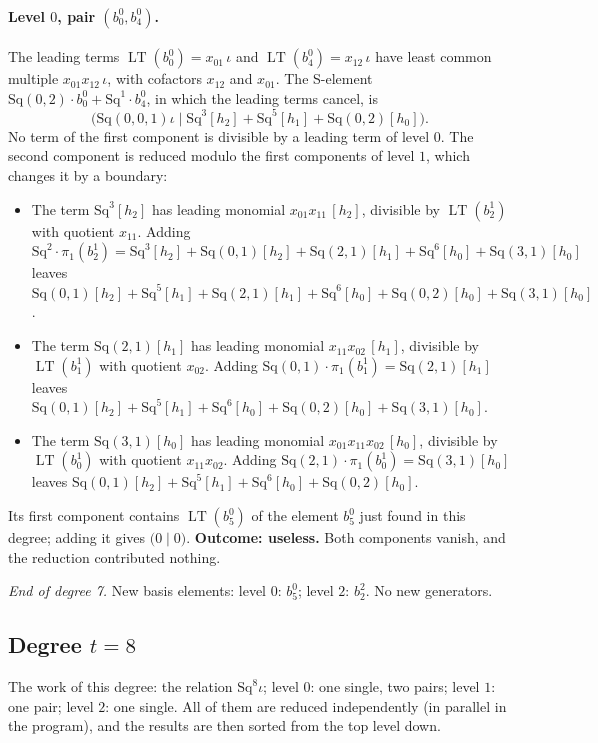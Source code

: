 \documentclass[11pt]{article}
\newcommand{\Sq}{\mathrm{Sq}}
\DeclareMathOperator{\LT}{LT}
\begin{document}
\paragraph{Level $0$, pair $(b^{0}_{0}, b^{0}_{4})$.} The leading terms $\LT(b^{0}_{0}) = x_{01}\,\iota$ and $\LT(b^{0}_{4}) = x_{12}\,\iota$ have least common multiple $x_{01}x_{12}\,\iota$, with cofactors $x_{12}$ and $x_{01}$. The S-element $\Sq(0,2)\cdot b^{0}_{0} + \Sq^{1}\cdot b^{0}_{4}$, in which the leading terms cancel, is
\[\bigl(\Sq(0,0,1)\iota \;\big|\; \Sq^{3}[h_2] + \Sq^{5}[h_1] + \Sq(0,2)[h_0]\bigr).\]
No term of the first component is divisible by a leading term of level $0$.
The second component is reduced modulo the first components of level $1$, which changes it by a boundary:
\begin{itemize}
\item The term $\Sq^{3}[h_2]$ has leading monomial $x_{01}x_{11}\,[h_2]$, divisible by $\LT(b^{1}_{2})$ with quotient $x_{11}$. Adding $\Sq^{2}\cdot \pi_1(b^{1}_{2}) = \Sq^{3}[h_2] + \Sq(0,1)[h_2] + \Sq(2,1)[h_1] + \Sq^{6}[h_0] + \Sq(3,1)[h_0]$ leaves $\Sq(0,1)[h_2] + \Sq^{5}[h_1] + \Sq(2,1)[h_1] + \Sq^{6}[h_0] + \Sq(0,2)[h_0] + \Sq(3,1)[h_0]$.
\item The term $\Sq(2,1)[h_1]$ has leading monomial $x_{11}x_{02}\,[h_1]$, divisible by $\LT(b^{1}_{1})$ with quotient $x_{02}$. Adding $\Sq(0,1)\cdot \pi_1(b^{1}_{1}) = \Sq(2,1)[h_1]$ leaves $\Sq(0,1)[h_2] + \Sq^{5}[h_1] + \Sq^{6}[h_0] + \Sq(0,2)[h_0] + \Sq(3,1)[h_0]$.
\item The term $\Sq(3,1)[h_0]$ has leading monomial $x_{01}x_{11}x_{02}\,[h_0]$, divisible by $\LT(b^{1}_{0})$ with quotient $x_{11}x_{02}$. Adding $\Sq(2,1)\cdot \pi_1(b^{1}_{0}) = \Sq(3,1)[h_0]$ leaves $\Sq(0,1)[h_2] + \Sq^{5}[h_1] + \Sq^{6}[h_0] + \Sq(0,2)[h_0]$.
\end{itemize}
Its first component contains $\LT(b^{0}_{5})$ of the element $b^{0}_{5}$ just found in this degree; adding it gives $\bigl(0 \;\big|\; 0\bigr)$.
\textbf{Outcome: useless.} Both components vanish, and the reduction contributed nothing.
\medskip
\par\noindent\emph{End of degree 7.} New basis elements: level $0$: $b^{0}_{5}$; level $2$: $b^{2}_{2}$. No new generators.
\subsection*{Degree $t = 8$}
\noindent The work of this degree: the relation $\Sq^{8}\iota$; level $0$: one single, two pairs; level $1$: one pair; level $2$: one single. All of them are reduced independently (in parallel in the program), and the results are then sorted from the top level down.
\medskip
\end{document}

